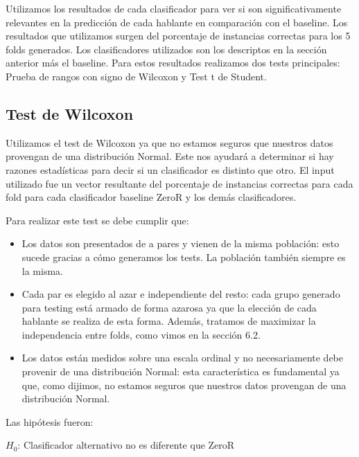 Utilizamos los resultados de cada clasificador para ver si son significativamente relevantes en la predicción de cada hablante en comparación con el baseline. Los resultados que utilizamos surgen del porcentaje de instancias correctas para los 5 folds generados. Los clasificadores utilizados son los descriptos en la sección anterior más el baseline. Para estos resultados realizamos dos tests principales: Prueba de rangos con signo de Wilcoxon y Test t de Student. 

\subsection{Test de Wilcoxon}

Utilizamos el test de Wilcoxon ya que no estamos seguros que nuestros datos provengan de una distribución Normal. Este nos ayudará a determinar si hay razones estadísticas para decir si un clasificador es distinto que otro. El input utilizado fue un vector resultante del porcentaje de instancias correctas para cada fold para cada clasificador baseline ZeroR y los demás clasificadores.

Para realizar este test se debe cumplir que:

\begin{itemize}
    \item Los datos son presentados de a pares y vienen de la misma población: esto sucede gracias a cómo generamos los tests. La población también siempre es la misma.
    \item Cada par es elegido al azar e independiente del resto: cada grupo generado para testing está armado de forma azarosa ya que la elección de cada hablante se realiza de esta forma. Además, tratamos de maximizar la independencia entre folds, como vimos en la sección 6.2.
    \item Los datos están medidos sobre una escala ordinal y no necesariamente debe provenir de una distribución Normal: esta característica es fundamental ya que, como dijimos, no estamos seguros que nuestros datos provengan de una distribución Normal.
\end{itemize}

Las hipótesis fueron:

\vspace{0.5cm}
\hspace{2cm}$H_0$: Clasificador alternativo no es diferente que ZeroR
\vspace{0.25cm}

